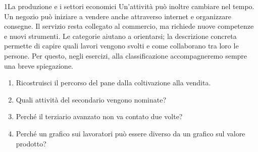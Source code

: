 \begin{lettura}{1}{La produzione e i settori economici}
Un'attività può inoltre cambiare nel tempo. Un negozio può iniziare a vendere anche attraverso internet e organizzare consegne. Il servizio resta collegato al commercio, ma richiede nuove competenze e nuovi strumenti. Le categorie aiutano a orientarsi; la descrizione concreta permette di capire quali lavori vengono svolti e come collaborano tra loro le persone. Per questo, negli esercizi, alla classificazione accompagneremo sempre una breve spiegazione.



\begin{center}\begin{minipage}{\linewidth}\centering
{}
\end{minipage}\end{center}


\attivita
\begin{enumerate}

\item Ricostruisci il percorso del pane dalla coltivazione alla vendita.

\item Quali attività del secondario vengono nominate?

\item Perché il terziario avanzato non va contato due volte?

\item Perché un grafico sui lavoratori può essere diverso da un grafico sul valore prodotto?

\end{enumerate}
\lessico





\end{lettura}
